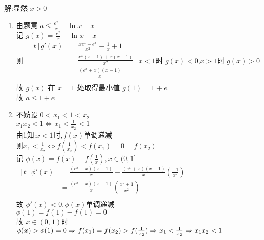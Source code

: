 \documentclass[class=ctexart,crop=false]{standalone}
\begin{document}
解:显然 $x>0$
\begin{enumerate}[label=(\arabic*)]
    \item 
    由题意 $a\leqslant \frac{e^x}{x}-\ln{x}+x$\\
    记 $g(x)=\frac{e^x}{x}-\ln{x}+x$\\
    则 $\begin{aligned}[t]
        g'(x)&=\frac{xe^x-e^x}{x^2}-\frac{1}{x}+1\\
        &=\frac{e^x(x-1)+x(x-1)}{x^2}\\
        &=\frac{(e^x+x)(x-1)}{x}\\
    \end{aligned}$ 
    $x<1$时 $g(x)<0$,$x>1$时 $g(x)>0$
    故 $g(x)$ 在 $x=1$ 处取得最小值 $g(1)=1+e$.\\
    故 $a \leqslant 1+e$
    \item   不妨设 $0<x_1<1<x_2$\\
            $x_1x_2<1\iff x_1<\frac{1}{x_2}<1$\\
            由1知:$x<1$时$,f(x)$单调递减\\
            则$x_1<\frac{1}{x_2}\Leftrightarrow f(\frac{1}{x_2})<f(x_1)=0=f(x_2)$\\
            记 $\phi(x)=f(x)-f(\frac{1}{x}),x\in (0,1]$\\
            $\begin{aligned}[t]
                \phi '(x)&=\frac{(e^x+x)(x-1)}{x}-\frac{(e^x+x)(x-1)}{x}(\frac{-1}{x^2})\\
                        &=\frac{(e^x+x)(x-1)}{x}(\frac{x^2+1}{x^2})\\
            \end{aligned}$\\
            故 $\phi'(x)<0,\phi(x)$单调递减\\
            $\phi(1)=f(1)-f(1)=0$\\
            故 $x\in (0,1)$时 $\phi(x)>\phi(1)=0\\
            \Rightarrow f(x_1)=f(x_2)>f(\frac{1}{x_2})\\
            \Rightarrow x_1<\frac{1}{x_2}\Rightarrow x_1x_2<1$
\end{enumerate}
\end{document}
